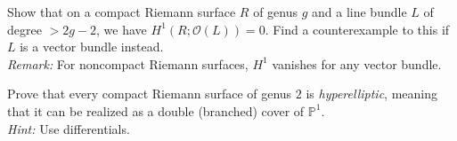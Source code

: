 \documentclass[12pt]{article}  %
\begin{document}
\begin{problem}[4]
Show that on a compact Riemann surface $R$ of genus $g$ and a line bundle $L$ of degree $> 2g-2$, we have $H^1(R; \mathcal{O}(L)) = 0$. Find a counterexample to this if $L$ is a vector bundle instead.\\
\textit{Remark:} For noncompact Riemann surfaces, $H^1$ vanishes for any vector bundle.
\end{problem}

\begin{solution}
\end{solution}

\begin{problem}[5]
Prove that every compact Riemann surface of genus $2$ is \textit{hyperelliptic}, meaning that it can be realized as a double (branched) cover of $\mathbb{P}^1$.\\
\textit{Hint:} Use differentials.
\end{problem}

\begin{solution}
\end{solution}
\end{document}
